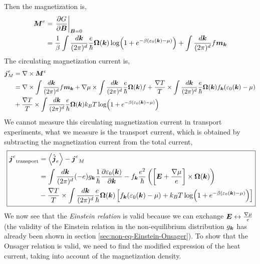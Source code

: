 \documentclass{report}
\renewcommand\vec[1]{\ensuremath\boldsymbol{#1}} %
\begin{document}
Then the magnetization is,
\begin{equation}\label{Eq:electric-magnetization}
	\begin{aligned}
		\vec{M}^e &= \left.\frac{\partial G}{\partial \vec{B}}\right|_{\vec{B}=0} \\
		&= \frac{1}{\beta} \int  \frac{d\vec{k}}{(2\pi)^d}  \frac{e}{\hbar} \vec{\Omega}(\vec{k}) \log(1 + e^{-\beta(\varepsilon_0(\vec{k}) - \mu)}) + \int  \frac{d\vec{k}}{(2\pi)^d} f \vec{m}_{\vec{k}}
	\end{aligned}
\end{equation}
The circulating magnetization current is,
\begin{equation}
\begin{aligned}
	\vec{j}^e_M &= \nabla \times \vec{M}^e \\
	&= \nabla \times \int \frac{d\vec{k}}{(2\pi)^d} f \vec{m}_{\vec{k}} + \nabla \mu \times \int  \frac{d\vec{k}}{(2\pi)^d} \frac{e}{\hbar} \vec{\Omega}(\vec{k}) f + \frac{\nabla T}{T}  \times \int  \frac{d\vec{k}}{(2\pi)^d} \frac{e}{\hbar} \vec{\Omega}(\vec{k}) f_{\vec{k}} (\varepsilon_0(\vec{k}) - \mu) \\
	&+ \frac{\nabla T}{T}  \times \int  \frac{d\vec{k}}{(2\pi)^d} \frac{e}{\hbar} \vec{\Omega}(\vec{k}) k_B T \log(1 + e^{-\beta(\varepsilon_0(\vec{k}) - \mu)})
\end{aligned}
\end{equation}
We cannot measure this circulating magnetization current in transport experiments, what we measure is the transport current, which is obtained by subtracting the magnetization current from the total current,
\begin{equation}~\label{Eq:transport-electric}
	\boxed{\begin{aligned}
	{{\vec{j}}^e}_{\text{transport}} &= \expval{\hat{\vec{j}}_e} - {\vec{j}^e}_{M} \\
	&= \int \frac{d\vec{k}}{(2\pi)^d} (-e){g}_{\vec{k}} \frac{1}{\hbar} \frac{\partial \varepsilon_0({{\vec{k}}})}{\partial \vec{k}} - {f}_{\vec{k}} \frac{e^2}{\hbar} \left(\left[\vec{E} + \frac{\nabla \mu}{e} \right] \times \vec{\Omega}(\vec{k})\right) \\
	&- \frac{\nabla T}{T}  \times \int  \frac{d\vec{k}}{(2\pi)^d} \frac{e}{\hbar} \vec{\Omega}(\vec{k}) \left[f_{\vec{k}} (\varepsilon_0(\vec{k}) - \mu) + k_B T \log(1 + e^{-\beta(\varepsilon_0(\vec{k}) - \mu)})\right]
	\end{aligned}}
\end{equation}
We now see that the \textit{Einstein relation} is valid because we can exchange $\vec{E} \leftrightarrow \frac{\nabla \mu}{e}$ (the validity of the Einstein relation in the non-equilibrium distribution $g_{\vec{k}}$ has already been shown in section \ref{sec:non-eq-Einstein-Onsager}). To show that the Onsager relation is valid, we need to find the modified expression of the heat current, taking into account of the magnetization density.
\end{document}
